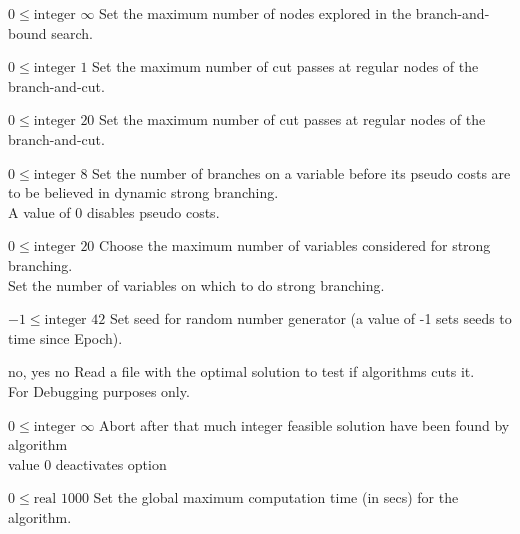 %
{$0\leq\textrm{integer}$}%
{$\infty$}%
{Set the maximum number of nodes explored in the branch-and-bound search.}%
{}

%
{$0\leq\textrm{integer}$}%
{$1$}%
{Set the maximum number of cut passes at regular nodes of the branch-and-cut.}%
{}

%
{$0\leq\textrm{integer}$}%
{$20$}%
{Set the maximum number of cut passes at regular nodes of the branch-and-cut.}%
{}

%
{$0\leq\textrm{integer}$}%
{$8$}%
{Set the number of branches on a variable before its pseudo costs are to be believed in dynamic strong branching.\\
A value of 0 disables pseudo costs.}%
{}

%
{$0\leq\textrm{integer}$}%
{$20$}%
{Choose the maximum number of variables considered for strong branching.\\
Set the number of variables on which to do strong branching.}%
{}

%
{$-1\leq\textrm{integer}$}%
{$42$}%
{Set seed for random number generator (a value of -1 sets seeds to time since Epoch).}%
{}

%
{\ttfamily no, yes}%
{no}%
{Read a file with the optimal solution to test if algorithms cuts it.\\
For Debugging purposes only.}%
{}

%
{$0\leq\textrm{integer}$}%
{$\infty$}%
{Abort after that much integer feasible solution have been found by algorithm\\
value 0 deactivates option}%
{}

%
{$0\leq\textrm{real}$}%
{$1000$}%
{Set the global maximum computation time (in secs) for the algorithm.}%
{}

